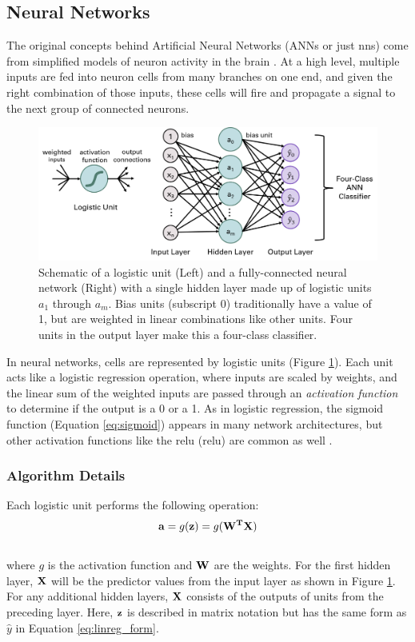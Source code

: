 \subsection{Neural Networks}\label{ch3:ann}
The original concepts behind Artificial Neural Networks (ANNs or just \acrshort{nn}s) come from simplified models of neuron activity in the brain \citep[p.\ 394]{hastie_elements_2009}. At a high level, multiple inputs are fed into neuron cells from many branches on one end, and given the right combination of those inputs, these cells will fire and propagate a signal to the next group of connected neurons.
\begin{figure}[H]
\centering
\includegraphics[width=\textwidth]{templates/images/Figure-ANN_schematic.png}
\caption[Neural network schematic]{Schematic of a logistic unit (Left) and a fully-connected neural network (Right) with a single hidden layer made up of logistic units $a_1$ through $a_m$. Bias units (subscript 0) traditionally have a value of 1, but are weighted in linear combinations like other units. Four units in the output layer make this a four-class classifier.}
\label{fig:nn_schematic}
\end{figure}

In neural networks, cells are represented by logistic units (Figure \ref{fig:nn_schematic}). Each unit acts like a logistic regression operation, where inputs are scaled by weights, and the linear sum of the weighted inputs are passed through an \textit{activation function} to determine if the output is a 0 or a 1. As in logistic regression, the sigmoid function (Equation \ref{eq:sigmoid}) appears in many network architectures, but other activation functions like the \acrlong{relu} (\acrshort{relu}) are common as well \citep{brownlee_gentle_2019}.

\subsubsection{Algorithm Details} \label{ch3:ann_details}
Each logistic unit performs the following operation:
\\
\begin{equation}
\label{eq:nn_activation}
    {\bf{a}} = g({\bf{z}}) = g({\bf{W^TX}})
\end{equation}
\\
where $g$ is the activation function and $\bf{W}$ are the weights. For the first hidden layer, $\bf{X}$ will be the predictor values from the input layer as shown in Figure \ref{fig:nn_schematic}. For any additional hidden layers, $\bf{X}$ consists of the outputs of units from the preceding layer. Here, $\bf{z}$ is described in matrix notation but has the same form as \(\hat{y}\) in Equation \ref{eq:linreg_form}.

